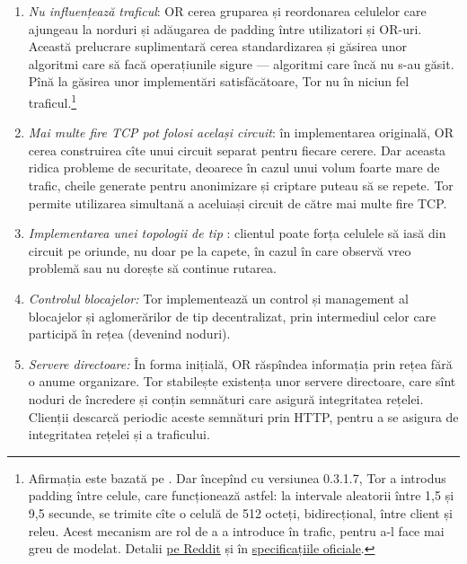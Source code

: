 \begin{enumerate}[(1)]
  \item \textit{Nu influențează traficul}: OR cerea gruparea și reordonarea
    celulelor care ajungeau la norduri și adăugarea de padding între utilizatori
    și OR-uri.
    Această prelucrare suplimentară cerea standardizarea și găsirea unor algoritmi
    care să facă operațiunile sigure --- algoritmi care încă nu s-au găsit. Pînă
    la găsirea unor implementări satisfăcătoare, Tor nu  în niciun
    fel traficul.\footnote{Afirmația este bazată pe \cite{whitepaper}. Dar
      începînd cu versiunea 0.3.1.7, Tor a introdus padding
      între celule, care funcționează astfel: la intervale aleatorii între 1,5 și 9,5
      secunde, se trimite cîte o celulă de 512 octeți, bidirecțional, între client
      și releu. Acest mecanism are rol de a a introduce  în trafic,
      pentru a-l face mai greu de modelat. 
      Detalii \href{https://www.reddit.com/r/TOR/comments/73i8cf/how_effective_is_tors_padding/}{pe Reddit}
    și în \href{https://www.torproject.org/docs/faq.html.en\#SendPadding}{specificațiile oficiale}.}
  \item \textit{Mai multe fire TCP pot folosi același circuit}: în implementarea
    originală, OR cerea construirea cîte unui circuit separat pentru
    fiecare cerere. Dar aceasta ridica probleme de securitate, deoarece
    în cazul unui volum foarte mare de trafic, cheile generate pentru
    anonimizare și criptare puteau să se repete. Tor permite utilizarea
    simultană a aceluiași circuit de către mai multe fire TCP.
  \item \textit{Implementarea unei topologii de tip }:
    clientul poate forța celulele să iasă din circuit pe oriunde, nu doar
    pe la capete, în cazul în care observă vreo problemă sau nu dorește
    să continue rutarea.
  \item \textit{Controlul blocajelor:} Tor implementează un control și
    management al blocajelor și a\-glo\-me\-ră\-ri\-lor de tip decentralizat,
    prin intermediul celor care participă în rețea (devenind noduri).
  \item \textit{Servere directoare:} În forma inițială, OR răspîndea
    informația prin rețea fără o anume organizare. Tor stabilește
    existența unor servere directoare, care sînt noduri de încredere
    și conțin semnături care asigură integritatea rețelei. Clienții
    descarcă periodic aceste semnături prin HTTP, pentru a se asigura
    de integritatea rețelei și a traficului.

\end{enumerate}
